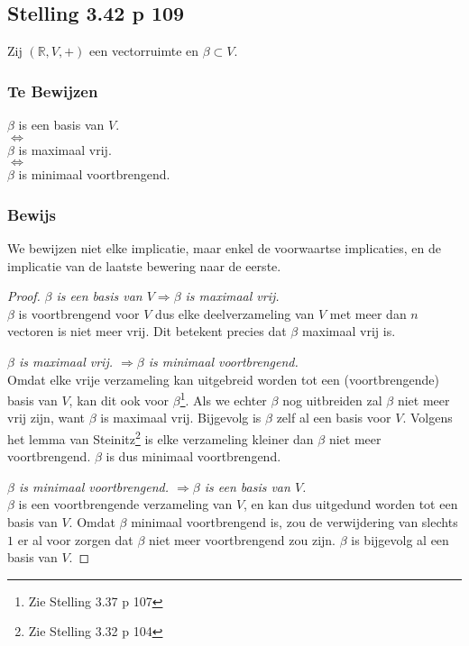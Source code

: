 \documentclass[lineaire_algebra_oplossingen.tex]{subfiles}
\begin{document}
\subsection{Stelling 3.42 p 109}
Zij $(\mathbb{R},V,+)$ een vectorruimte en $\beta \subset V$.
\subsubsection*{Te Bewijzen}
\begin{center}
$\beta$ is een basis van $V$.\\$\Leftrightarrow$\\
$\beta$ is maximaal vrij.\\$\Leftrightarrow$\\
$\beta$ is minimaal voortbrengend.
\end{center}
\subsubsection*{Bewijs}
We bewijzen niet elke implicatie, maar enkel de voorwaartse implicaties, en de implicatie van de laatste bewering naar de eerste.
\begin{proof}
\item \emph{$\beta$ is een basis van $V \Rightarrow \beta$ is maximaal vrij.}\\
$\beta$ is voortbrengend voor $V$ dus elke deelverzameling van $V$ met meer dan $n$ vectoren is niet meer vrij. Dit betekent precies dat $\beta$ maximaal vrij is.
\item \emph{$\beta$ is maximaal vrij. $\Rightarrow \beta$ is minimaal voortbrengend.}\\
Omdat elke vrije verzameling kan uitgebreid worden tot een (voortbrengende) basis van $V$, kan dit ook voor $\beta$\footnote{Zie Stelling 3.37 p 107}. Als we echter $\beta$ nog uitbreiden zal $\beta$ niet meer vrij zijn, want $\beta$ is maximaal vrij. Bijgevolg is $\beta$ zelf al een basis voor $V$. Volgens het lemma van Steinitz\footnote{Zie Stelling 3.32 p 104} is elke verzameling kleiner dan $\beta$ niet meer voortbrengend. $\beta$ is dus minimaal voortbrengend.
\item \emph{$\beta$ is minimaal voortbrengend. $\Rightarrow \beta$ is een basis van $V$.}\\ $\beta$ is een voortbrengende verzameling van $V$, en kan dus uitgedund worden tot een basis van $V$. Omdat $\beta$ minimaal voortbrengend is, zou de verwijdering van slechts $1$ er al voor zorgen dat $\beta$ niet meer voortbrengend zou zijn. $\beta$ is bijgevolg al een basis van $V$.
\end{proof}
\end{document}
